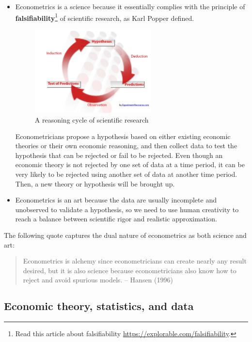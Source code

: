 \documentclass[a4paper,11pt]{article}
\begin{document}
\begin{itemize}
\item Econometrics is a science because it essentially complies with the
principle of \textbf{falsifiability}\footnote{Read this article about falsifiability \url{https://explorable.com/falsifiability}.} of scientific research, as Karl Popper
defined.

\begin{figure}[htbp]
\centering
\includegraphics[width=0.6\textwidth]{figure/reasoning-cycle-research.jpg}
\caption{\label{fig:org9e00561}
A reasoning cycle of scientific research}
\end{figure}

Econometricians propose a hypothesis based on either existing economic
theories or their own economic reasoning, and then collect data to
test the hypothesis that can be rejected or fail to be rejected. Even
though an economic theory is not rejected by one set of data at a
time period, it can be very likely to be rejected using another set of
data at another time period. Then, a new theory or hypothesis will
be brought up.

\item Econometrics is an art because the data are usually incomplete and
unobserved to validate a hypothesis, so we need to use human
creativity to reach a balance between scientific rigor and realistic
approximation.
\end{itemize}

The following quote captures the dual nature of econometrics as both
science and art:
\begin{quote}
Econometrics is alchemy since econometricians can create nearly any
result desired, but it is also science because econometricians also
know how to reject and avoid spurious models. -- Hansen (1996)
\end{quote}


\subsection{Economic theory, statistics, and data}
\label{sec:org39e6e4e}
\end{document}
